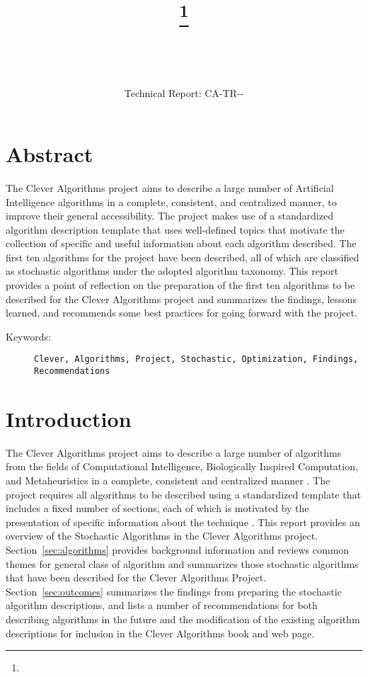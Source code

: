 \documentclass[a4paper, 11pt]{article}
\title{{\myreporttitle}\footnote{\myreportlicense}}
\author{\myreportauthor\\{\myreportemail}\\\small\myreportproject}
\date{\myreportfulldate\\{\small{Technical Report: CA-TR-{\myreportdate}-\myreportversion}}}
\begin{document}
\maketitle

\section*{Abstract} 
The Clever Algorithms project aims to describe a large number of Artificial Intelligence algorithms in a complete, consistent, and centralized manner, to improve their general accessibility. 
The project makes use of a standardized algorithm description template that uses well-defined topics that motivate the collection of specific and useful information about each algorithm described.
The first ten algorithms for the project have been described, all of which are classified as stochastic algorithms under the adopted algorithm taxonomy.
This report provides a point of reflection on the preparation of the first ten algorithms to be described for the Clever Algorithms project and summarizes the findings, lessons learned, and recommends some best practices for going forward with the project.


\begin{description}
	\item[Keywords:] {\small\texttt{Clever, Algorithms, Project, Stochastic, Optimization, Findings, Recommendations}}
\end{description} 

\section{Introduction}
\label{sec:introduction}
The Clever Algorithms project aims to describe a large number of algorithms from the fields of Computational Intelligence, Biologically Inspired Computation, and Metaheuristics in a complete, consistent and centralized manner \cite{Brownlee2010}.
The project requires all algorithms to be described using a standardized template that includes a fixed number of sections, each of which is motivated by the presentation of specific information about the technique \cite{Brownlee2010a}.
This report provides an overview of the Stochastic Algorithms in the Clever Algorithms project. 
Section~\ref{sec:algorithms} provides background information and reviews common themes for general class of algorithm and summarizes those stochastic algorithms that have been described for the Clever Algorithms Project.
Section~\ref{sec:outcomes} summarizes the findings from preparing the stochastic algorithm descriptions, and lists a number of recommendations for both describing algorithms in the future and the modification of the existing algorithm descriptions for inclusion in the Clever Algorithms book and web page.
\end{document}
